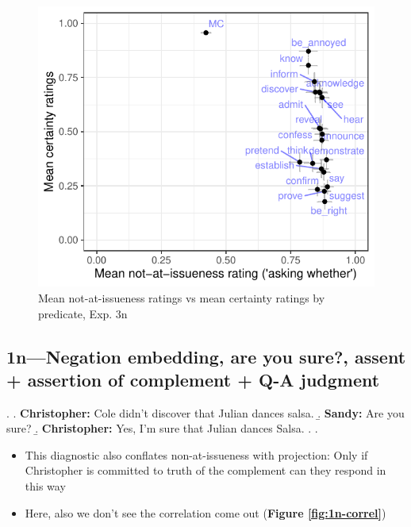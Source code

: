 \documentclass[11pt]{article}
\begin{document}
			\begin{figure}[h]
				\centering
				\includegraphics[scale=0.90]{figures/n3-correl.pdf}
				\caption{Mean not-at-issueness ratings vs mean certainty ratings by predicate, Exp. 3n}
				\label{fig:figure6}
			\end{figure}


	\pagebreak
	\subsection{1n---Negation embedding, are you sure?, assent + assertion of complement + Q-A judgment} %
		\ex. \a. \textbf{Christopher:} Cole didn’t discover that Julian dances salsa.
				\b. \textbf{Sandy:} Are you sure?
				\b. \textbf{Christopher:} Yes, I'm sure that Julian dances Salsa.
				\z.
			\z.

		\begin{itemize}
			\item This diagnostic also conflates non-at-issueness with projection: Only if Christopher is committed to truth of the complement can they respond in this way 

			\item Here, also we don't see the correlation come out (\textbf{Figure \ref{fig:1n-correl}})
		\end{itemize}
\end{document}

